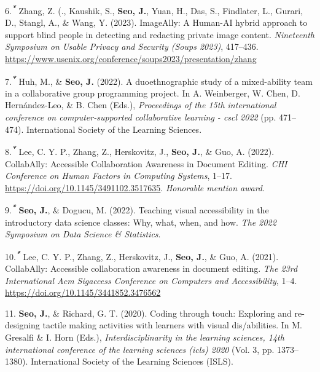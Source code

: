 \documentclass[11pt,a4paper,]{awesome-cv}
\begin{document}
\leavevmode\hypertarget{ref-289496}{}%
6.\textsuperscript{\emph{\textbf{*}}} Zhang, Z. (., Kaushik, S.,
\textbf{Seo, J.}, Yuan, H., Das, S., Findlater, L., Gurari, D., Stangl,
A., \& Wang, Y. (2023). ImageAlly: A Human-AI hybrid approach to support
blind people in detecting and redacting private image content.
\emph{Nineteenth Symposium on Usable Privacy and Security (Soups 2023)},
417--436.
\url{https://www.usenix.org/conference/soups2023/presentation/zhang}

\leavevmode\hypertarget{ref-huh2022duoethnographic}{}%
7.\textsuperscript{\emph{\textbf{*}}} Huh, M., \& \textbf{Seo, J.}
(2022). A duoethnographic study of a mixed-ability team in a
collaborative group programming project. In A. Weinberger, W. Chen, D.
Hernández-Leo, \& B. Chen (Eds.), \emph{Proceedings of the 15th
international conference on computer-supported collaborative learning -
cscl 2022} (pp. 471--474). International Society of the Learning
Sciences.

\leavevmode\hypertarget{ref-leeCollabAllyAccessibleCollaboration2022a}{}%
8.\textsuperscript{\emph{\textbf{*}}} Lee, C. Y. P., Zhang, Z.,
Herskovitz, J., \textbf{Seo, J.}, \& Guo, A. (2022). CollabAlly:
Accessible Collaboration Awareness in Document Editing. \emph{CHI
Conference on Human Factors in Computing Systems}, 1--17.
\url{https://doi.org/10.1145/3491102.3517635}. \emph{Honorable mention
award}.

\leavevmode\hypertarget{ref-teachingvisualaccessibility2022}{}%
9.\textsuperscript{\emph{\textbf{*}}} \textbf{Seo, J.}, \& Dogucu, M.
(2022). Teaching visual accessibility in the introductory data science
classes: Why, what, when, and how. \emph{The 2022 Symposium on Data
Science \& Statistics}.

\leavevmode\hypertarget{ref-lee2021collabally}{}%
10.\textsuperscript{\emph{\textbf{*}}} Lee, C. Y. P., Zhang, Z.,
Herskovitz, J., \textbf{Seo, J.}, \& Guo, A. (2021). CollabAlly:
Accessible collaboration awareness in document editing. \emph{The 23rd
International Acm Sigaccess Conference on Computers and Accessibility},
1--4. \url{https://doi.org/10.1145/3441852.3476562}

\leavevmode\hypertarget{ref-seo2020coding}{}%
11. \textbf{Seo, J.}, \& Richard, G. T. (2020). Coding through touch:
Exploring and re-designing tactile making activities with learners with
visual dis/abilities. In M. Gresalfi \& I. Horn (Eds.),
\emph{Interdisciplinarity in the learning sciences, 14th international
conference of the learning sciences (icls) 2020} (Vol. 3, pp.
1373--1380). International Society of the Learning Sciences (ISLS).
\end{document}
